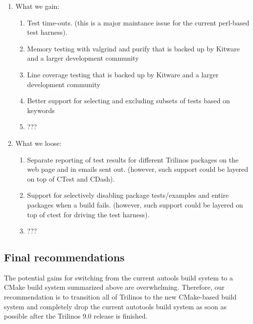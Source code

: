 \documentclass[pdf,ps2pdf,11pt]{SANDreport}
\begin{document}
\begin{enumerate}

{}\item What we gain:

  \begin{enumerate}

  {}\item Test time-outs. (this is a major maintance issue for the
  current perl-based test harness).

  {}\item Memory testing with valgrind and purify that is backed up by
  Kitware and a larger development community

  {}\item Line coverage testing that is backed up by Kitware and a larger
  development community

  {}\item Better support for selecting and excluding subsets of tests
  based on keywords

  {}\item ???

  \end{enumerate}

{}\item What we loose:

  \begin{enumerate}

  {}\item Separate reporting of test results for different Trilinos
  packages on the web page and in emails sent out. (however, such
  support could be layered on top of CTest and CDash).

  {}\item Support for selectively disabling package tests/examples and
  entire packages when a build fails.  (however, such support could be
  layered on top of ctest for driving the test harness).

  {}\item ???

  \end{enumerate}

\end{enumerate}


%
\subsection{Final recommendations}
%

The potential gains for switching from the current autools build
system to a CMake build system summarized above are overwhelming.
Therefore, our recommendation is to transition all of Trilinos to the
new CMake-based build system and completely drop the current autotools
build system as soon as possible after the Trilinos 9.0 release is
finished.
\end{document}
